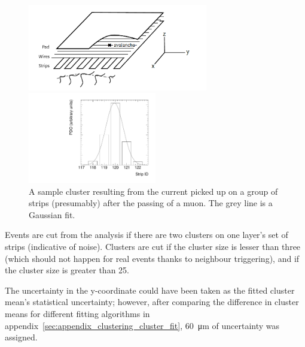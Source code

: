 \begin{figure}
    \centering
    \includegraphics[width = 0.7\textwidth]{figures/mwpc_lefebvre_thesis_gatti.png}
    \caption{A sketch of an sTGC-like detector. The position of the avalanche could be extracted from the wires and strips that picked up the avalanche signal. The signals on individual strips are sketched. Clustering was the processs of fitting a Gaussian to the peak value of the signals on individual contiguous strips, as is done in figure~\ref{fig:sample_cluster}. In this work, the x(y)-coordinate will always refer to the coordinate perpendicular to the wires (strips)~\cite{lefebvre_thesis, gatti_optimum_1979}.}
    \label{fig:mwpc_coords}
    \vspace*{\floatsep}
    \centering
    \includegraphics[width = 0.5\textwidth]{figures/sample_cluster_QL2C04_event5_layer2.pdf}
    \caption{A sample cluster resulting from the current picked up on a group of strips (presumably) after the passing of a muon. The grey line is a Gaussian fit.}
    \label{fig:sample_cluster}
\end{figure}

Events are cut from the analysis if there are two clusters on one layer's set of strips (indicative of noise). Clusters are cut if the cluster size is lesser than three (which should not happen for real events thanks to neighbour triggering), and if the cluster size is greater than 25.

The uncertainty in the y-coordinate could have been taken as the fitted cluster mean's statistical uncertainty; however, after comparing the difference in cluster means for different fitting algorithms in appendix~\ref{sec:appendix_clustering_cluster_fit}, \SI{60}{\micro\meter} of uncertainty was assigned.

